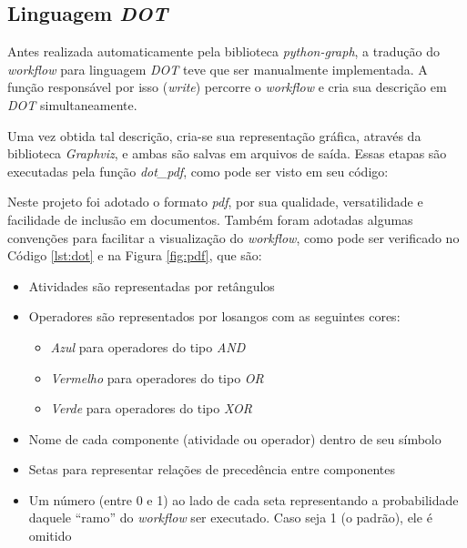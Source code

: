 \documentclass[a4paper,11pt]{article}
\begin{document}
  	\newpage
  	\subsection{Linguagem \emph{DOT}}
  		Antes realizada automaticamente pela biblioteca \emph{python-graph}, a tradução do \emph{workflow} para linguagem \emph{DOT} teve que ser manualmente implementada. A função responsável por isso (\emph{write}) percorre o \emph{workflow} e cria sua descrição em \emph{DOT} simultaneamente.

      Uma vez obtida tal descrição, cria-se sua representação gráfica, através da biblioteca \emph{Graphviz}, e ambas são salvas em arquivos de saída. Essas etapas são executadas pela funç\~ao \emph{dot\_pdf}, como pode ser visto em seu c\'odigo: 

  		

  		Neste projeto foi adotado o formato \emph{pdf}, por sua qualidade, versatilidade e facilidade de inclusão em documentos. Também foram adotadas algumas convenç\~oes para facilitar a visualização do \emph{workflow}, como pode ser verificado no C\'odigo \ref{lst:dot} e na Figura \ref{fig:pdf}, que s\~ao:

        \begin{itemize}
            \item Atividades s\~ao representadas por ret\^angulos
            \item Operadores s\~ao representados por losangos com as seguintes cores:

            \begin{itemize}
                \item \emph{Azul} para operadores do tipo \emph{AND}
                \item \emph{Vermelho} para operadores do tipo \emph{OR}
                \item \emph{Verde} para operadores do tipo \emph{XOR}
            \end{itemize}

            \item Nome de cada componente (atividade ou operador) dentro de seu s\'imbolo
            \item Setas para representar relaç\~oes de preced\^encia entre componentes
            \item Um n\'umero (entre 0 e 1) ao lado de cada seta representando a probabilidade daquele ``ramo'' do \emph{workflow} ser executado. Caso seja 1 (o padr\~ao), ele \'e omitido

        \end{itemize}
\end{document}
